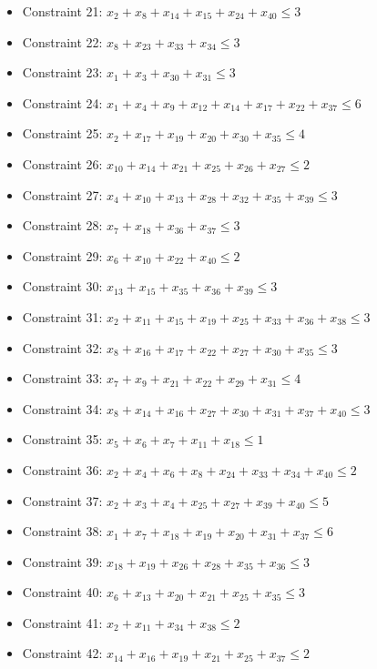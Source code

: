 \documentclass[11pt]{article}
\begin{document}
\begin{itemize}
\item Constraint 21: $x_{2} + x_{8} + x_{14} + x_{15} + x_{24} + x_{40} \le 3$
\item Constraint 22: $x_{8} + x_{23} + x_{33} + x_{34} \le 3$
\item Constraint 23: $x_{1} + x_{3} + x_{30} + x_{31} \le 3$
\item Constraint 24: $x_{1} + x_{4} + x_{9} + x_{12} + x_{14} + x_{17} + x_{22} + x_{37} \le 6$
\item Constraint 25: $x_{2} + x_{17} + x_{19} + x_{20} + x_{30} + x_{35} \le 4$
\item Constraint 26: $x_{10} + x_{14} + x_{21} + x_{25} + x_{26} + x_{27} \le 2$
\item Constraint 27: $x_{4} + x_{10} + x_{13} + x_{28} + x_{32} + x_{35} + x_{39} \le 3$
\item Constraint 28: $x_{7} + x_{18} + x_{36} + x_{37} \le 3$
\item Constraint 29: $x_{6} + x_{10} + x_{22} + x_{40} \le 2$
\item Constraint 30: $x_{13} + x_{15} + x_{35} + x_{36} + x_{39} \le 3$
\item Constraint 31: $x_{2} + x_{11} + x_{15} + x_{19} + x_{25} + x_{33} + x_{36} + x_{38} \le 3$
\item Constraint 32: $x_{8} + x_{16} + x_{17} + x_{22} + x_{27} + x_{30} + x_{35} \le 3$
\item Constraint 33: $x_{7} + x_{9} + x_{21} + x_{22} + x_{29} + x_{31} \le 4$
\item Constraint 34: $x_{8} + x_{14} + x_{16} + x_{27} + x_{30} + x_{31} + x_{37} + x_{40} \le 3$
\item Constraint 35: $x_{5} + x_{6} + x_{7} + x_{11} + x_{18} \le 1$
\item Constraint 36: $x_{2} + x_{4} + x_{6} + x_{8} + x_{24} + x_{33} + x_{34} + x_{40} \le 2$
\item Constraint 37: $x_{2} + x_{3} + x_{4} + x_{25} + x_{27} + x_{39} + x_{40} \le 5$
\item Constraint 38: $x_{1} + x_{7} + x_{18} + x_{19} + x_{20} + x_{31} + x_{37} \le 6$
\item Constraint 39: $x_{18} + x_{19} + x_{26} + x_{28} + x_{35} + x_{36} \le 3$
\item Constraint 40: $x_{6} + x_{13} + x_{20} + x_{21} + x_{25} + x_{35} \le 3$
\item Constraint 41: $x_{2} + x_{11} + x_{34} + x_{38} \le 2$
\item Constraint 42: $x_{14} + x_{16} + x_{19} + x_{21} + x_{25} + x_{37} \le 2$

\end{itemize}
\end{document}
